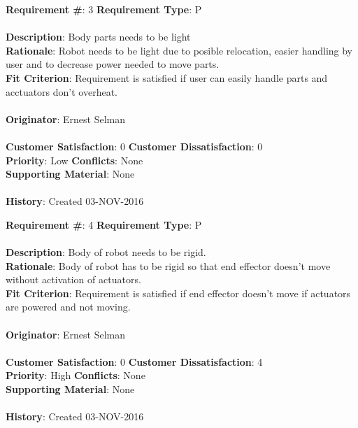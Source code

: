 \documentclass[titlepage]{article}
\begin{document}
\begin{framed}
	\noindent\textbf{Requirement \#}: 3 \hfill \textbf{Requirement Type}: P \hfill\\\\
	\noindent\textbf{Description}: Body parts needs to be light \\
	\textbf{Rationale}: Robot needs to be light due to posible relocation, easier handling by user and to decrease power needed to move parts. \\
	\textbf{Fit Criterion}: Requirement is satisfied if user can easily handle parts and acctuators don't overheat. \\\\
	\textbf{Originator}: Ernest Selman\\\\
	\noindent\textbf{Customer Satisfaction}: 0 \hfill 	\textbf{Customer Dissatisfaction}: 0 \hfill\\
	\textbf{Priority}: Low \hfill \textbf{Conflicts}: None \hfill\\
	\textbf{Supporting Material}: None\\\\
	\noindent\textbf{History}: Created 03-NOV-2016
\end{framed}

\begin{framed}
	\noindent\textbf{Requirement \#}: 4 \hfill \textbf{Requirement Type}: P \hfill\\\\
	\noindent\textbf{Description}: Body of robot needs to be rigid. \\
	\textbf{Rationale}: Body of robot has to be rigid so that end effector doesn't move without activation of actuators. \\
	\textbf{Fit Criterion}: Requirement is satisfied if end effector doesn't move if actuators are powered and not moving.\\\\
	\textbf{Originator}: Ernest Selman\\\\
	\noindent\textbf{Customer Satisfaction}: 0 \hfill 	\textbf{Customer Dissatisfaction}: 4 \hfill\\
	\textbf{Priority}: High \hfill \textbf{Conflicts}: None \hfill\\
	\textbf{Supporting Material}: None\\\\
	\noindent\textbf{History}: Created 03-NOV-2016
\end{framed}
\end{document}
